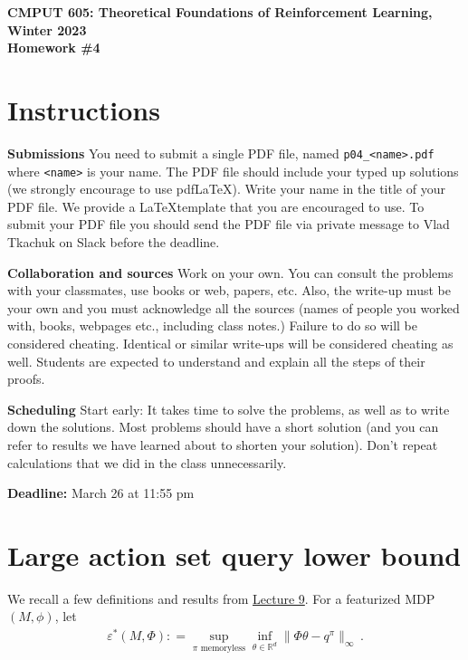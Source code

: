 \documentclass{article}
\newcommand{\hwnumber}{4}
\DeclareMathOperator*{\1}{\mathbbm{1}}
\newcommand{\0}{\mathbf{0}}
\theoremstyle{definition}
\theoremstyle{remark}
\theoremstyle{theorem}
\begin{document}
\begin{center}
{\Large \textbf{CMPUT 605: Theoretical Foundations of Reinforcement Learning, Winter 2023\\ Homework \#\hwnumber}}
\end{center}

\section*{Instructions}
\textbf{Submissions}
You need to submit a single PDF file, named {\tt p0\hwnumber\_<name>.pdf} where {\tt <name>} is your name.
The PDF file should include your typed up solutions (we strongly encourage to use pdf\LaTeX). 
Write your name in the title of your PDF file.
We provide a \LaTeX template that you are encouraged to use.
To submit your PDF file you should send the PDF file via private message to Vlad Tkachuk on Slack before the deadline.

\textbf{Collaboration and sources}
Work on your own. You can consult the problems with your classmates, use books
or web, papers, etc.
Also, the write-up must be your own and you must acknowledge all the
sources (names of people you worked with, books, webpages etc., including class notes.) 
Failure to do so will be considered cheating.  
Identical or similar write-ups will be considered cheating as well.
Students are expected to understand and explain all the steps of their proofs.

\textbf{Scheduling}
Start early: It takes time to solve the problems, as well as to write down the solutions. Most problems should have a short solution (and you can refer to results we have learned about to shorten your solution). Don't repeat calculations that we did in the class unnecessarily.

\vspace{0.3cm}

\textbf{Deadline:} March 26 at 11:55 pm

\newcommand{\cM}{\mathcal{M}}
\newcommand{\nS}{\mathrm{S}}
\newcommand{\nA}{\mathrm{A}}
\newcommand{\PP}{\mathbb{P}}
\newcommand{\RR}{\mathbb{R}}
\newcommand{\ip}[1]{\langle #1 \rangle}
\newcommand{\N}{\mathbb{N}}
\newcommand{\cG}{\mathcal{G}}

\section*{Large action set query lower bound}


We recall a few definitions and results from 
\href{https://rltheory.github.io/lecture-notes/planning-in-mdps/lec9/}{Lecture 9}.
For a featurized MDP $(M,\phi)$, let
\begin{align}
\varepsilon^*(M,\Phi) : = \sup_{\pi \text{ memoryless}} \inf_{\theta\in \mathbb{R}^d} \| \Phi \theta - q^\pi \|_\infty\,.
\label{eq:polerr}
\end{align}
\end{document}

